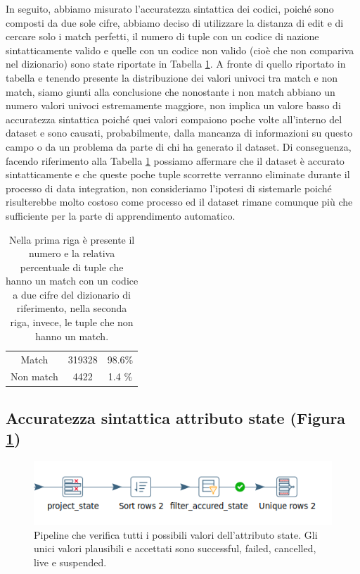 In seguito, abbiamo misurato l'accuratezza sintattica dei codici, poiché sono composti da due sole cifre, abbiamo deciso di utilizzare la distanza di edit e di cercare solo i match perfetti, il numero di tuple con un codice di nazione sintatticamente valido e quelle con un codice non valido (cioè che non compariva nel dizionario) sono state riportate in Tabella \ref{tab:code_country_compl}.
A fronte di quello riportato in tabella e tenendo presente la distribuzione dei valori univoci tra match e non match, siamo giunti alla conclusione che nonostante i non match abbiano un numero valori univoci estremamente maggiore, non implica un valore basso di accuratezza sintattica poiché quei valori compaiono poche volte all'interno del dataset e sono causati, probabilmente, dalla mancanza di informazioni su questo campo o da un problema da parte di chi ha generato il dataset. 
Di conseguenza, facendo riferimento alla Tabella \ref{tab:code_country_compl} possiamo affermare che il dataset è accurato sintatticamente e che queste poche tuple scorrette verranno eliminate durante il processo di data integration, non consideriamo l'ipotesi di sistemarle poiché risulterebbe molto costoso come processo ed il dataset rimane comunque più che sufficiente per la parte di apprendimento automatico.

\begin{table}
	\caption{Nella prima riga è presente il numero e la relativa percentuale di tuple che hanno un match con un codice a due cifre del dizionario di riferimento, nella seconda riga, invece, le tuple che non hanno un match.}
	
	\label{tab:code_country_compl}
	
	\centering
	\begin{tabular}{c|cc}
		Match & 319328 & 98.6\% \\ 
		Non match & 4422 & 1.4 \% \\
	\end{tabular}
\end{table} 



\subsection{Accuratezza sintattica attributo state (Figura \ref{fig:dqstateaccuracy})}

\begin{figure}[h!]
	\centering
	\includegraphics[width=0.7\linewidth]{images/DQ_stateaccuracy}
	\caption{Pipeline che verifica tutti i possibili valori dell'attributo state. Gli unici valori plausibili e accettati sono successful, failed, cancelled, live e suspended.}
	\label{fig:dqstateaccuracy}
\end{figure}


